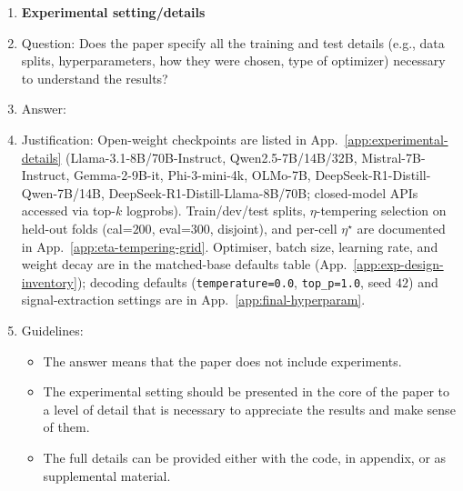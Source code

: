 \begin{enumerate}
\item \textbf{Experimental setting/details}
    \item[] Question: Does the paper specify all the training and test details (e.g., data splits, hyperparameters, how they were chosen, type of optimizer) necessary to understand the results?
    \item[] Answer: \answerYes{}
    \item[] Justification: Open-weight checkpoints are listed in App.~\ref{app:experimental-details} (Llama-3.1-8B/70B-Instruct, Qwen2.5-7B/14B/32B, Mistral-7B-Instruct, Gemma-2-9B-it, Phi-3-mini-4k, OLMo-7B, DeepSeek-R1-Distill-Qwen-7B/14B, DeepSeek-R1-Distill-Llama-8B/70B; closed-model APIs accessed via top-$k$ logprobs). Train/dev/test splits, $\eta$-tempering selection on held-out folds (cal=$200$, eval=$300$, disjoint), and per-cell $\eta^\star$ are documented in App.~\ref{app:eta-tempering-grid}. Optimiser, batch size, learning rate, and weight decay are in the matched-base defaults table (App.~\ref{app:exp-design-inventory}); decoding defaults (\texttt{temperature=0.0}, \texttt{top\_p=1.0}, seed $42$) and signal-extraction settings are in App.~\ref{app:final-hyperparam}.
    \item[] Guidelines:
    \begin{itemize}
        \item The answer \answerNA{} means that the paper does not include experiments.
        \item The experimental setting should be presented in the core of the paper to a level of detail that is necessary to appreciate the results and make sense of them.
        \item The full details can be provided either with the code, in appendix, or as supplemental material.
    \end{itemize}


\end{enumerate}

